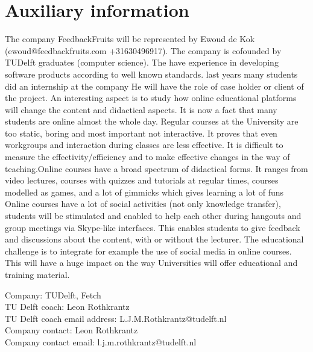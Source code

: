 \section*{Auxiliary information}

The company FeedbackFruits will be represented by Ewoud de Kok (ewoud@feedbackfruits.com +31630496917). The company is cofounded by TUDelft graduates (computer science). The have experience in developing software products according to well known standards. last years many students did an internship at the company He will have the role of case holder or client of the project. An interesting aspect is to study how online educational platforms will change the content and didactical aspects. It is now a fact that many students are online almost the whole day. Regular courses at the University are too static, boring and most important not interactive. It proves that even workgroups and interaction during classes are less effective. It is difficult to measure the effectivity/efficiency and to make effective changes in the way of teaching.Online courses have a broad spectrum of didactical forms. It ranges from video lectures, courses with quizzes and tutorials at regular times, courses modelled as games, and a lot of gimmicks which gives learning a lot of funs Online courses have a lot of social activities (not only knowledge transfer), students will be stimulated and enabled to help each other during hangouts and group meetings via Skype-like interfaces. This enables students to give feedback and discussions about the content, with or without the lecturer. The educational challenge is to integrate for example the use of social media in online courses. This will have a huge impact on the way Universities will offer educational and training material.

Company: TUDelft, Fetch\\
TU Delft coach: Leon Rothkrantz\\
TU Delft coach email address: L.J.M.Rothkrantz@tudelft.nl\\
Company contact: Leon Rothkrantz\\
Company contact email: l.j.m.rothkrantz@tudelft.nl